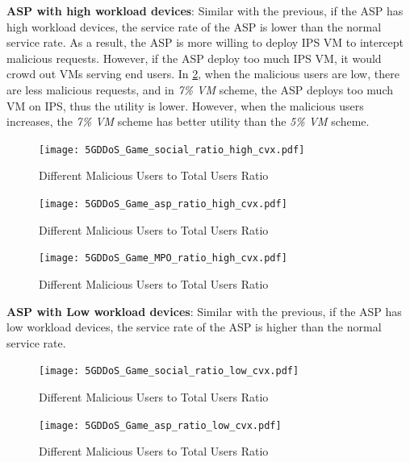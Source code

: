 \documentclass[conference]{IEEEtran}
\begin{document}
\textbf{ASP with high workload devices}: Similar with the previous, if the ASP has high workload devices, the service rate of the ASP is lower than the normal service rate. As a result, the ASP is more willing to deploy IPS VM to intercept malicious requests. However, if the ASP deploy too much IPS VM, it would crowd out VMs serving end users. In \cref{fig:ratio_asp_high}, when the malicious users are low, there are less malicious requests, and in \textit{7\% VM} scheme, the ASP deploys too much VM on IPS, thus the utility is lower. However, when the malicious users increases, the \textit{7\% VM} scheme has better utility than the \textit{5\% VM} scheme.

\begin{figure}[!ht]
  \texttt{[image: 5GDDoS\_Game\_social\_ratio\_high\_cvx.pdf]}
    \caption{Different Malicious Users to Total Users Ratio}
\label{fig:ratio_soc_high}
\end{figure}

\begin{figure}[!ht]
  \texttt{[image: 5GDDoS\_Game\_asp\_ratio\_high\_cvx.pdf]}
    \caption{Different Malicious Users to Total Users Ratio}
\label{fig:ratio_asp_high}
\end{figure}

\begin{figure}[!ht]
  \texttt{[image: 5GDDoS\_Game\_MPO\_ratio\_high\_cvx.pdf]}
    \caption{Different Malicious Users to Total Users Ratio}
\label{fig:ratio_mpo_high}
\end{figure}

\textbf{ASP with Low workload devices}: 
Similar with the previous, if the ASP has low workload devices, the service rate of the ASP is higher than the normal service rate.
\begin{figure}[!ht]
  \texttt{[image: 5GDDoS\_Game\_social\_ratio\_low\_cvx.pdf]}
    \caption{Different Malicious Users to Total Users Ratio}
\label{fig:ratio_soc_low}
\end{figure}

\begin{figure}[!ht]
  \texttt{[image: 5GDDoS\_Game\_asp\_ratio\_low\_cvx.pdf]}
    \caption{Different Malicious Users to Total Users Ratio}
\label{fig:ratio_asp_low}
\end{figure}
\end{document}
